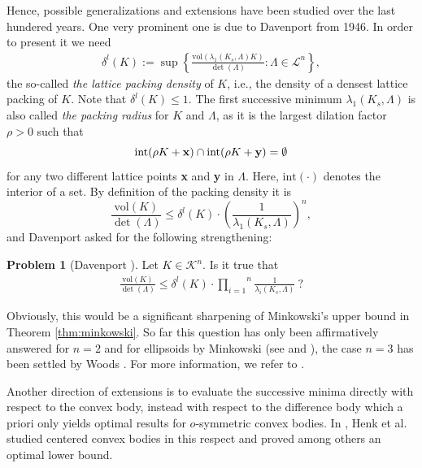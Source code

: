 \documentclass{amsart}
\theoremstyle{definition}
\newtheorem{probman}[theoman]{Problem}
\theoremstyle{remark}
\numberwithin{equation}{section}
\begin{document}
Hence, possible generalizations and extensions have been studied  over the last hundered years. One very prominent one is due to Davenport from 1946. In order to present it we need  
\begin{align*}
    \delta^l(K):=\sup\left\{\frac{\mathrm{vol}(\lambda_1(K_s,\Lambda)K)}{\det(\Lambda)}:\Lambda\in\mathcal{L}^n\right\},
\end{align*}
the so-called {\it the lattice packing density} of $K$, i.e., the density of a densest lattice packing of $K$. Note that $\delta^l(K)\leq 1$. The first successive minimum $\lambda_1(K_s,\Lambda)$ is also  called {\it the packing radius} for $K$ and $\Lambda$, as it is the largest dilation factor $\rho>0$ such that 
$$\mathrm{int}(\rho K+{\bf x})\cap\mathrm{int}(\rho K+{\bf y})=\emptyset$$
for any two different lattice points {\bf x} and {\bf y} in $\Lambda$. Here, $\mathrm{int}(\cdot)$ denotes the interior of a set. By definition of the packing density it is
\begin{equation}
    \frac{\mathrm{vol}(K)}{\det(\Lambda)}\le\delta^l(K)\cdot\left(\frac{1}{\lambda_1(K_s,\Lambda)}\right)^n,
\label{eq:davenport1}    
\end{equation}
and  Davenport asked for the following strengthening:  
\begin{probman}[Davenport \cite{davenport1946}]\label{davenport's problem}
    Let $K\in\mathcal{K}^n$. Is it true that
    \begin{align}\label{ineq:Davenport}
       \frac{\mathrm{vol}(K)}{\det(\Lambda)}\le\delta^l(K)\cdot\overset{n}{\underset{i=1}{\prod}}\frac{1}{\lambda_i(K_s,\Lambda)}~? 
    \end{align}
\end{probman}
Obviously, this would be a significant sharpening of Minkowski's upper bound in Theorem \ref{thm:minkowski}.  
So far this question has only been affirmatively answered for $n=2$ and for ellipsoids by Minkowski (see \cite{minkowski1896} and \cite{gruber2007}), the case $n=3$ has been settled by Woods \cite{woods1956}. For more information, we refer to \cite{gruber2007}.

Another direction of extensions is to evaluate the successive minima directly with respect to the convex body, instead with respect to the difference body which a priori only yields optimal results for $o$-symmetric convex bodies.  In \cite{hhh2016}, Henk et al. studied centered convex bodies in this respect and proved among others an optimal lower bound.
\end{document}
